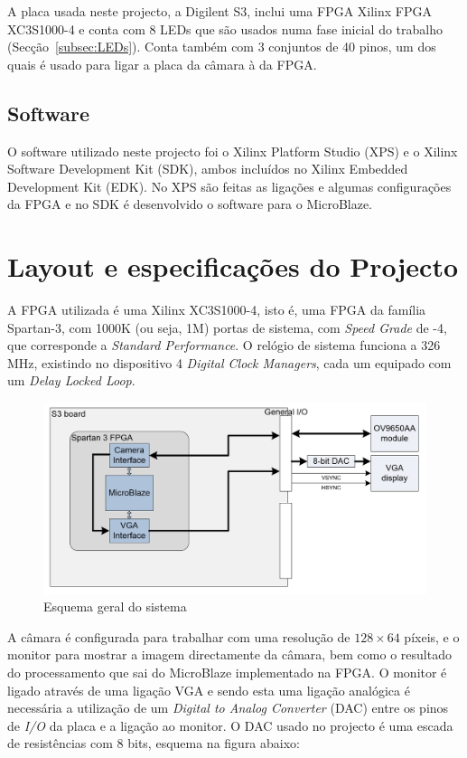 \documentclass[a4paper,12pt]{article}
\begin{document}
A placa usada neste projecto, a Digilent S3,  inclui uma FPGA Xilinx FPGA XC3S1000-4 e conta com 8 LEDs que são usados numa fase inicial do trabalho (Secção~\ref{subsec:LEDs}). Conta também com 3 conjuntos de 40 pinos, um dos quais é usado para ligar a placa da câmara à da FPGA.

\subsection*{Software}
O software utilizado neste projecto foi o Xilinx Platform Studio (XPS) e o Xilinx Software Development Kit (SDK), ambos incluídos no Xilinx Embedded Development Kit (EDK). No XPS são feitas as ligações e algumas configurações da FPGA e no SDK é desenvolvido o software para o MicroBlaze.

\section{Layout e especificações do Projecto}

A FPGA utilizada é uma Xilinx XC3S1000-4, isto é, uma FPGA da família Spartan-3, com 1000K (ou seja, 1M) portas de sistema, com \textit{Speed Grade} de -4, que corresponde a \textit{Standard Performance}. O relógio de sistema funciona a 326 MHz, existindo no dispositivo 4 \textit{Digital Clock Managers}, cada um equipado com um \textit{Delay Locked Loop}.

\begin{figure}[h]
	\centering	
	\includegraphics[scale = 0.3]{imagens/esquema_projecto.png}
	\caption{Esquema geral do sistema}
	\label{fig:esquemaGeral}
\end{figure}
\FloatBarrier

A câmara é configurada para trabalhar com uma resolução de $128\times64$ píxeis, e o monitor para mostrar a imagem directamente da câmara, bem como o resultado do processamento que sai do MicroBlaze implementado na FPGA. O monitor é ligado através de uma ligação VGA e sendo esta uma ligação analógica é necessária a utilização de um \textit{Digital to Analog Converter} (DAC) entre os pinos de \textit{I/O} da placa e a ligação ao monitor. O DAC usado no projecto é uma escada de resistências  com 8 bits, esquema na figura abaixo: 
\end{document}
